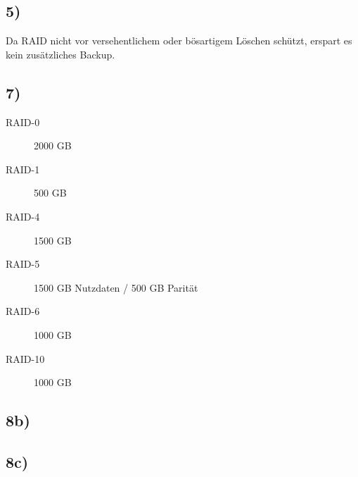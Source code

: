 \documentclass[ngerman]{fbi-aufgabenblatt}
\begin{document}
\subsection*{5)}
Da RAID nicht vor versehentlichem oder bösartigem Löschen schützt, erspart es kein zusätzliches Backup.

\subsection*{7)}
\begin{description}
	\item[RAID-0] 2000 GB
	\item [RAID-1] 500 GB
	\item [RAID-4] 1500 GB
	\item [RAID-5] 1500 GB Nutzdaten / 500 GB Parität
	\item [RAID-6] 1000 GB
	\item[RAID-10] 1000 GB
\end{description} 

\subsection*{8b)}

\subsection*{8c)}
\end{document}
